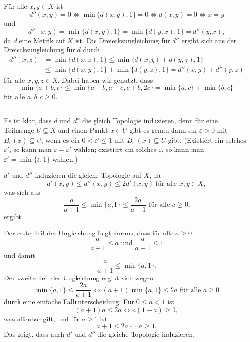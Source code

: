 \documentclass[a4paper,10pt]{article}
\begin{document}
\subsection{}
Für alle $x,y \in X$ ist
\[
 d''(x,y) = 0
 \Leftrightarrow \min\{d(x,y),1\} = 0
 \Leftrightarrow d(x,y) = 0
 \Leftrightarrow x=y
\]
und
\[
 d''(x,y) = \min\{d(x,y),1\} = \min\{d(y,x),1\} = d''(y,x),
\]
da $d$ eine Metrik auf $X$ ist. Die Dreiecksungleichung für $d''$ ergibt sich aus der Dreiecksungleichung für $d$ durch
\begin{align*}
 d''(x,z)
 &= \min\{d(x,z),1\}
 \leq \min\{d(x,y)+d(y,z),1\} \\
 &\leq \min\{d(x,y),1\} + \min\{d(y,z),1\}
 = d''(x,y)+d''(y,z)
\end{align*}
für alle $x,y,z \in X$. Dabei haben wir genutzt, dass
\[
 \min\{a+b,c\} \leq \min\{a+b,a+c,c+b,2c\} = \min\{a,c\}+\min\{b,c\}
\]
für alle $a,b,c \geq 0$.


\subsection{}
Es ist klar, dass $d$ und $d''$ die gleich Topologie induzieren, denn für eine Teilmenge $U \subseteq X$ und einen Punkt $x \in U$ gibt es genau dann ein $\varepsilon > 0$ mit $B_\varepsilon(x) \subseteq U$, wenn es ein $0 < \varepsilon’ \leq 1$ mit $B_{\varepsilon'}(x) \subseteq U$ gibt. (Existiert ein solches $\varepsilon'$, so kann man $\varepsilon = \varepsilon'$ wählen; existiert ein solches $\varepsilon$, so kann man $\varepsilon' = \min\{\varepsilon,1\}$ wählen.)

$d'$ und $d''$ induzieren die gleiche Topologie auf $X$, da
\[
 d'(x,y) \leq d''(x,y) \leq 2d'(x,y) \text{ für alle } x,y \in X,
\]
was sich aus
\[
 \frac{a}{a+1} \leq \min\{a,1\} \leq \frac{2a}{a+1} \text{ für alle } a \geq 0.
\]
ergibt.

Der erste Teil der Ungleichung folgt daraus, dass für alle $a \geq 0$
\[
 \frac{a}{a+1} \leq a \text{ und } \frac{a}{a+1} \leq 1
\]
und damit
\[
 \frac{a}{a+1} \leq \min\{a,1\}.
\]
Der zweite Teil der Ungleichung ergibt sich wegen
\[
 \min\{a,1\} \leq \frac{2a}{a+1}
 \Leftrightarrow (a+1)\min\{a,1\} \leq 2a \text{ für alle } a \geq 0
\]
durch eine einfache Fallunterscheidung: Für $0 \leq a < 1$ ist
\[
 (a+1)a \leq 2a \Leftrightarrow a(1-a) \geq 0,
\]
was offenbar gilt, und für $a \geq 1$ ist
\[
 a+1 \leq 2a \Leftrightarrow a \geq 1.
\]
Das zeigt, dass auch $d'$ und $d''$ die gleiche Topologie induzieren.
\end{document}
